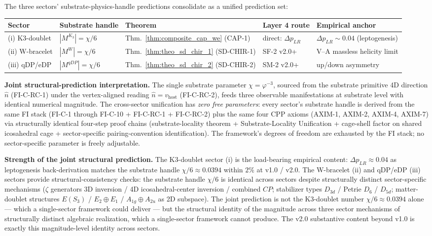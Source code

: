 \documentclass[11pt,letterpaper]{article}
\newcommand{\phig}{\varphi}
\newcommand{\Kthree}{\ensuremath{K_3}}
\newcommand{\DeltapLR}{\Delta p_{LR}}
\newcommand{\Dsix}{D_6}
\newcommand{\Sthree}{S_3}
\begin{document}
The three sectors' substrate-physics-handle predictions consolidate as a unified prediction set:

\begin{center}
\begin{tabular}{lllll}
\toprule
Sector & Substrate handle & Theorem & Layer 4 route & Empirical anchor \\
\midrule
(i) K3-doublet & $|M^{\Kthree}| = \chi/6$ & Thm.~\ref{thm:composite_cap_we} (CAP-1) & direct: $\DeltapLR$ & $\DeltapLR \sim 0.04$ (leptogenesis) \\
(ii) W-bracelet & $|M^W| = \chi/6$ & Thm.~\ref{thm:theo_sd_chir_1} (SD-CHIR-1) & SF-2 v2.0+ & V--A massless helicity limit \\
(iii) qDP/eDP & $|M^{qDP}| = \chi/6$ & Thm.~\ref{thm:theo_sd_chir_2} (SD-CHIR-2) & SM-2 v2.0+ & up/down asymmetry \\
\bottomrule
\end{tabular}
\end{center}

\medskip

\textbf{Joint structural-prediction interpretation.} The single substrate parameter $\chi = \phig^{-3}$, sourced from the substrate primitive 4D direction $\hat{n}$ (FI-C-RC-1) under the vertex-aligned reading $\hat{n} = v_{\text{host}}$ (FI-C-RC-2), feeds three observable manifestations at substrate level with identical numerical magnitude. The cross-sector unification has \emph{zero free parameters}: every sector's substrate handle is derived from the same FI stack (FI-C-1 through FI-C-10 + FI-C-RC-1 + FI-C-RC-2) plus the same four CPP axioms (AXIM-1, AXIM-2, AXIM-4, AXIM-7) via structurally identical four-step proof chains (substrate-locality theorem + Substrate-Locality Unification + cage-shell factor on shared icosahedral cage + sector-specific pairing-convention identification). The framework's degrees of freedom are exhausted by the FI stack; no sector-specific parameter is freely adjustable.

\textbf{Strength of the joint structural prediction.} The K3-doublet sector (i) is the load-bearing empirical content: $\DeltapLR \approx 0.04$ as leptogenesis back-derivation matches the substrate handle $\chi/6 \approx 0.0394$ within $2\%$ at v1.0 / v2.0. The W-bracelet (ii) and qDP/eDP (iii) sectors provide structural-consistency checks: the substrate handle $\chi/6$ is identical across sectors despite structurally distinct sector-specific mechanisms ($\zeta$ generators 3D inversion / 4D icosahedral-center inversion / combined $CP$; stabilizer types $D_{3d}$ / Petrie $\Dsix$ / $D_{5d}$; matter-doublet structures $E(\Sthree)$ / $E_2 \oplus E_1$ / $A_{1g} \oplus A_{2u}$ as 2D subspace). The joint prediction is not the K3-doublet number $\chi/6 \approx 0.0394$ alone --- which a single-sector framework could deliver --- but the structural identity of the magnitude across three sector mechanisms of structurally distinct algebraic realization, which a single-sector framework cannot produce. The v2.0 substantive content beyond v1.0 is exactly this magnitude-level identity across sectors.
\end{document}

